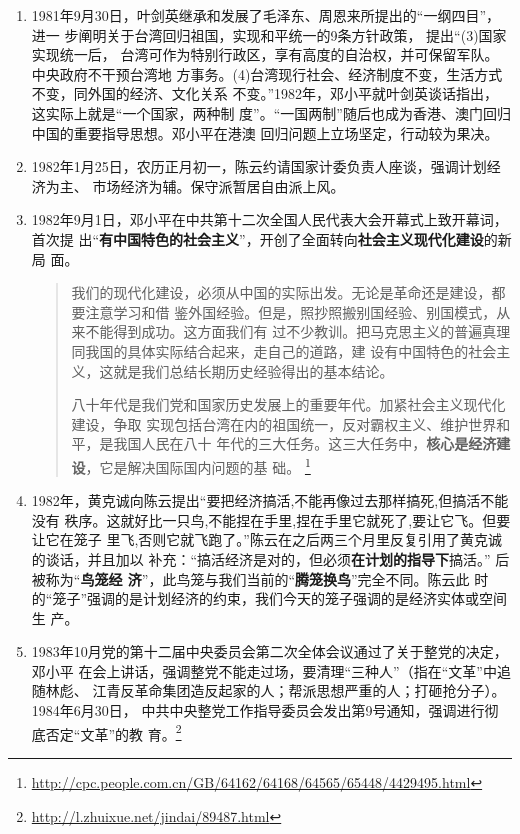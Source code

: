 \begin{enumerate}
\item 1981年9月30日，叶剑英继承和发展了毛泽东、周恩来所提出的“一纲四目”，进一
  步阐明关于台湾回归祖国，实现和平统一的9条方针政策， 提出“(3)国家实现统一后，
  台湾可作为特别行政区，享有高度的自治权，并可保留军队。中央政府不干预台湾地
  方事务。(4)台湾现行社会、经济制度不变，生活方式不变，同外国的经济、文化关系
  不变。”1982年，邓小平就叶剑英谈话指出，这实际上就是“一个国家，两种制
  度”。“一国两制”随后也成为香港、澳门回归中国的重要指导思想。邓小平在港澳
  回归问题上立场坚定，行动较为果决。

\item 1982年1月25日，农历正月初一，陈云约请国家计委负责人座谈，强调计划经济为主、
  市场经济为辅。保守派暂居自由派上风。

\item 1982年9月1日，邓小平在中共第十二次全国人民代表大会开幕式上致开幕词，首次提
  出“\textbf{有中国特色的社会主义}”，开创了全面转向\textbf{社会主义现代化建设}的新局
  面。
  \begin{quotation}
    我们的现代化建设，必须从中国的实际出发。无论是革命还是建设，都要注意学习和借
    鉴外国经验。但是，照抄照搬别国经验、别国模式，从来不能得到成功。这方面我们有
    过不少教训。把马克思主义的普遍真理同我国的具体实际结合起来，走自己的道路，建
    设有中国特色的社会主义，这就是我们总结长期历史经验得出的基本结论。

    八十年代是我们党和国家历史发展上的重要年代。加紧社会主义现代化建设，争取
    实现包括台湾在内的祖国统一，反对霸权主义、维护世界和平，是我国人民在八十
    年代的三大任务。这三大任务中，\textbf{核心是经济建设}，它是解决国际国内问题的基
    础。
    \footnote{\url{http://cpc.people.com.cn/GB/64162/64168/64565/65448/4429495.html}}
  \end{quotation}

\item 1982年，黄克诚向陈云提出“要把经济搞活,不能再像过去那样搞死,但搞活不能没有
  秩序。这就好比一只鸟,不能捏在手里,捏在手里它就死了,要让它飞。但要让它在笼子
  里飞,否则它就飞跑了。”陈云在之后两三个月里反复引用了黄克诚的谈话，并且加以
  补充：“搞活经济是对的，但必须\textbf{在计划的指导下}搞活。” 后被称为“\textbf{鸟笼经
    济}”\cite{chenyunjihua}，此鸟笼与我们当前的“\textbf{腾笼换鸟}”完全不同。陈云此
  时的“笼子”强调的是计划经济的约束，我们今天的笼子强调的是经济实体或空间生
  产。

\item 1983年10月党的第十二届中央委员会第二次全体会议通过了关于整党的决定，邓小平
  在会上讲话，强调整党不能走过场，要清理“三种人”（指在“文革”中追随林彪、
  江青反革命集团造反起家的人；帮派思想严重的人；打砸抢分子）。1984年6月30日，
  中共中央整党工作指导委员会发出第9号通知，强调进行彻底否定“文革”的教
  育。\footnote{\url{http://l.zhuixue.net/jindai/89487.html}}


\end{enumerate}
